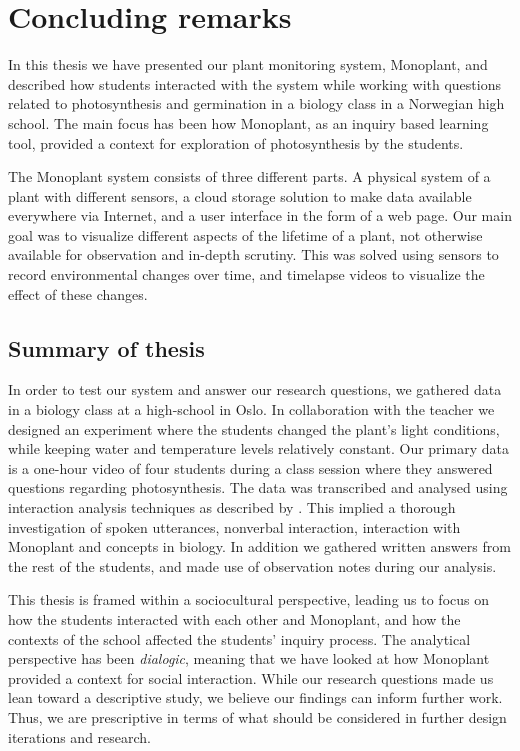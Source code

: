 \chapter{Concluding remarks}
In this thesis we have presented our plant monitoring system, Monoplant, and described how students interacted with the system while working with questions related to photosynthesis and germination in a biology class in a Norwegian high school. The main focus has been how Monoplant, as an inquiry based learning tool, provided a context for exploration of photosynthesis by the students. 

The Monoplant system consists of three different parts. A physical system of a plant with different sensors, a cloud storage solution to make data available everywhere via Internet, and a user interface in the form of a web page. Our main goal was to visualize different aspects of the lifetime of a plant, not otherwise available for observation and in-depth scrutiny. This was solved using sensors to record environmental changes over time, and timelapse videos to visualize the effect of these changes. 

\section{Summary of thesis}
In order to test our system and answer our research questions, we gathered data in a biology class at a high-school in Oslo. In collaboration with the teacher we designed an experiment where the students changed the plant's light conditions, while keeping water and temperature levels relatively constant. Our primary data is a one-hour video of four students during a class session where they answered questions regarding photosynthesis. The data was transcribed and analysed using interaction analysis techniques as described by \citet{jordan1995interaction}. This implied a thorough investigation of spoken utterances, nonverbal interaction, interaction with Monoplant and concepts in biology. In addition we gathered written answers from the rest of the students, and made use of observation notes during our analysis. 

This thesis is framed within a sociocultural perspective, leading us to focus on how the students interacted with each other and Monoplant, and how the contexts of the school affected the students' inquiry process. The analytical perspective has been \emph{dialogic}, meaning that we have looked at how Monoplant provided a context for social interaction. While our research questions made us lean toward a descriptive study, we believe our findings can inform further work. Thus, we are prescriptive in terms of what should be considered in further design iterations and research.


